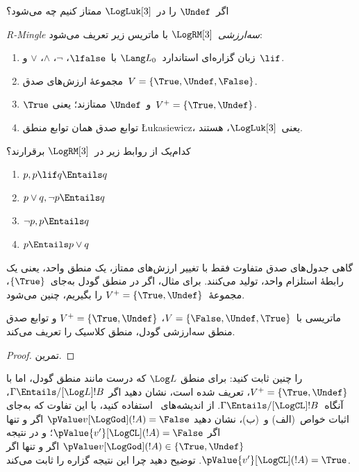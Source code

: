 \documentclass[../../../include/open-logic-section]{subfiles}
\begin{document}
اگر~$\Undef$ را در~$\LogLuk[3]$ ممتاز کنیم چه می‌شود؟

\begin{defn}
  \emph{R-Mingle سه‌ارزشی}~$\LogRM[3]$ با ماتریس زیر تعریف می‌شود:
  \begin{enumerate}
    \item زبان گزاره‌ای استاندارد~$\Lang L_0$ با~$\lfalse$، $\lnot$،
    $\land$، $\lor$ و~$\lif$.
    \item مجموعهٔ ارزش‌های صدق~$V = \{\True, \Undef, \False\}$.
    \item $\True$ و~$\Undef$ ممتازند؛ یعنی~$V^+ = \{\True, \Undef\}$.
    \item توابع صدق همان توابع منطق \L ukasiewicz، یعنی~$\LogLuk[3]$،
    هستند.
  \end{enumerate}
\end{defn}

\begin{prob}
  کدام‌یک از روابط زیر در~$\LogRM[3]$ برقرارند؟
  \begin{enumerate}
    \item $p, p \lif q \Entails q$
    \item $p \lor q, \lnot p \Entails q$
    \item $\lnot p, p \Entails q$
    \item $p \Entails p \lor q$
  \end{enumerate}
\end{prob}

گاهی جدول‌های صدق متفاوت فقط با تغییر ارزش‌های ممتاز، یک منطق واحد،
یعنی یک رابطهٔ استلزام واحد، تولید می‌کنند. برای مثال، اگر در منطق گودل
به‌جای~$\{\True\}$، مجموعهٔ~$V^+ = \{\True, \Undef\}$ را بگیریم، چنین
می‌شود.

\begin{prop}
  ماتریسی با~$V = \{\False, \Undef,\True\}$،
  $V^+=\{\True, \Undef\}$ و توابع صدق منطق سه‌ارزشی گودل، منطق کلاسیک
  را تعریف می‌کند.
\end{prop}

\begin{proof}
  تمرین.
\end{proof}

\begin{prob}
   را چنین ثابت کنید: برای منطق
  $\Log L$ که درست مانند منطق گودل، اما با
  $V^+=\{\True,\Undef\}$، تعریف شده است، نشان دهید اگر
  $\Gamma \Entails/[\Log L] !B$، آنگاه~$\Gamma \Entails/[\LogCL] !B$.
  از اندیشه‌های~ استفاده کنید، با
  این تفاوت که به‌جای اثبات خواص~(الف) و~(ب)، نشان دهید
  $\pValue v[\LogGod](!A) = \False$ اگر و تنها اگر
  $\pValue {v'}[\LogCL](!A) = \False$؛ و در نتیجه
  $\pValue v[\LogGod](!A) \in \{\True,\Undef\}$ اگر و تنها اگر
  $\pValue {v'}[\LogCL](!A) = \True$. توضیح دهید چرا این نتیجه گزاره
  را ثابت می‌کند.
\end{prob}
\end{document}
